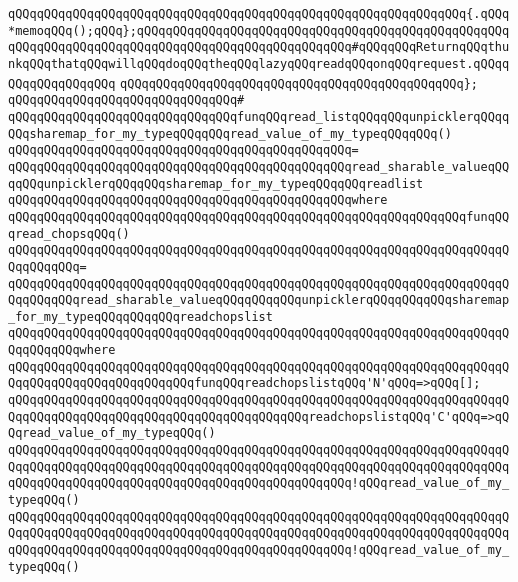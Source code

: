 \verb|qQQqqQQqqQQqqQQqqQQqqQQqqQQqqQQqqQQqqQQqqQQqqQQqqQQqqQQqqQQqqQQq{.qQQq*memoqQQq();qQQq};qQQqqQQqqQQqqQQqqQQqqQQqqQQqqQQqqQQqqQQqqQQqqQQqqQQqqQQqqQQqqQQqqQQqqQQqqQQqqQQqqQQqqQQqqQQqqQQqqQQq#qQQqqQQqReturnqQQqthunkqQQqthatqQQqwillqQQqdoqQQqtheqQQqlazyqQQqreadqQQqonqQQqrequest.qQQqqQQqqQQqqQQqqQQq|\newline
\verb|qQQqqQQqqQQqqQQqqQQqqQQqqQQqqQQqqQQqqQQqqQQqqQQq};|\newline
\newline
\verb|qQQqqQQqqQQqqQQqqQQqqQQqqQQqqQQq#|\newline
\verb|qQQqqQQqqQQqqQQqqQQqqQQqqQQqqQQqfunqQQqread_listqQQqqQQqunpicklerqQQqqQQqsharemap_for_my_typeqQQqqQQqread_value_of_my_typeqQQqqQQq()|\newline
\verb|qQQqqQQqqQQqqQQqqQQqqQQqqQQqqQQqqQQqqQQqqQQqqQQq=|\newline
\verb|qQQqqQQqqQQqqQQqqQQqqQQqqQQqqQQqqQQqqQQqqQQqqQQqread_sharable_valueqQQqqQQqunpicklerqQQqqQQqsharemap_for_my_typeqQQqqQQqreadlist|\newline
\verb|qQQqqQQqqQQqqQQqqQQqqQQqqQQqqQQqqQQqqQQqqQQqqQQqwhere|\newline
\verb|qQQqqQQqqQQqqQQqqQQqqQQqqQQqqQQqqQQqqQQqqQQqqQQqqQQqqQQqqQQqqQQqfunqQQqread_chopsqQQq()|\newline
\verb|qQQqqQQqqQQqqQQqqQQqqQQqqQQqqQQqqQQqqQQqqQQqqQQqqQQqqQQqqQQqqQQqqQQqqQQqqQQqqQQq=|\newline
\verb|qQQqqQQqqQQqqQQqqQQqqQQqqQQqqQQqqQQqqQQqqQQqqQQqqQQqqQQqqQQqqQQqqQQqqQQqqQQqqQQqread_sharable_valueqQQqqQQqqQQqunpicklerqQQqqQQqqQQqsharemap_for_my_typeqQQqqQQqqQQqreadchopslist|\newline
\verb|qQQqqQQqqQQqqQQqqQQqqQQqqQQqqQQqqQQqqQQqqQQqqQQqqQQqqQQqqQQqqQQqqQQqqQQqqQQqqQQqwhere|\newline
\verb|qQQqqQQqqQQqqQQqqQQqqQQqqQQqqQQqqQQqqQQqqQQqqQQqqQQqqQQqqQQqqQQqqQQqqQQqqQQqqQQqqQQqqQQqqQQqqQQqfunqQQqreadchopslistqQQq'N'qQQq=>qQQq[];|\newline
\verb|qQQqqQQqqQQqqQQqqQQqqQQqqQQqqQQqqQQqqQQqqQQqqQQqqQQqqQQqqQQqqQQqqQQqqQQqqQQqqQQqqQQqqQQqqQQqqQQqqQQqqQQqqQQqqQQqreadchopslistqQQq'C'qQQq=>qQQqread_value_of_my_typeqQQq()|\newline
\verb|qQQqqQQqqQQqqQQqqQQqqQQqqQQqqQQqqQQqqQQqqQQqqQQqqQQqqQQqqQQqqQQqqQQqqQQqqQQqqQQqqQQqqQQqqQQqqQQqqQQqqQQqqQQqqQQqqQQqqQQqqQQqqQQqqQQqqQQqqQQqqQQqqQQqqQQqqQQqqQQqqQQqqQQqqQQqqQQqqQQqqQQqqQQq!qQQqread_value_of_my_typeqQQq()|\newline
\verb|qQQqqQQqqQQqqQQqqQQqqQQqqQQqqQQqqQQqqQQqqQQqqQQqqQQqqQQqqQQqqQQqqQQqqQQqqQQqqQQqqQQqqQQqqQQqqQQqqQQqqQQqqQQqqQQqqQQqqQQqqQQqqQQqqQQqqQQqqQQqqQQqqQQqqQQqqQQqqQQqqQQqqQQqqQQqqQQqqQQqqQQqqQQq!qQQqread_value_of_my_typeqQQq()|\newline
